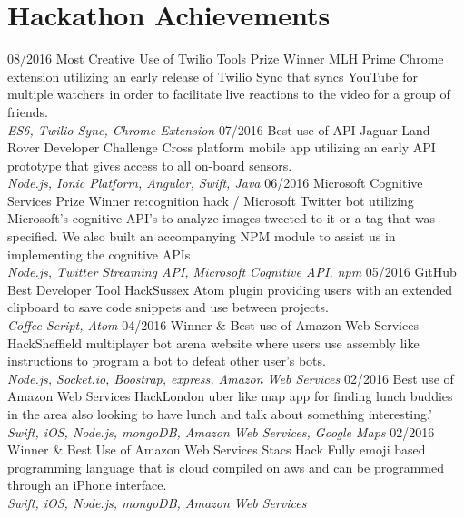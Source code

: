 \documentclass[]{friggeri-cv}
\begin{document}
\section{Hackathon Achievements}
\begin{entrylist}
  \entry
    {08/2016}
    {Most Creative Use of Twilio Tools Prize Winner}
    {MLH Prime}
    {Chrome extension utilizing an early release of Twilio Sync that syncs YouTube for multiple watchers in order to facilitate live reactions to the video for a group of friends.\\
   	\emph{ES6, Twilio Sync, Chrome Extension}}
    \entry
    {07/2016}
    {Best use of API}
    {Jaguar Land Rover Developer Challenge}
    {Cross platform mobile app utilizing an early API prototype that gives access to all on-board sensors.\\
    \emph{Node.js, Ionic Platform, Angular, Swift, Java}}
        \entry
    {06/2016}
    {Microsoft Cognitive Services Prize Winner}
    {re:cognition hack / Microsoft}
    {Twitter bot utilizing Microsoft's cognitive API's to analyze images tweeted to it or a tag that was specified. We also built an accompanying NPM module to assist us in implementing the cognitive APIs\\
    \emph{Node.js, Twitter Streaming API, Microsoft Cognitive API, npm}}
        \entry
    {05/2016}
    {GitHub Best Developer Tool}
    {HackSussex}
    {Atom plugin providing users with an extended clipboard to save code snippets and use between projects. \\
    \emph{Coffee Script, Atom}}
        \entry
    {04/2016}
    {Winner \& Best use of Amazon Web Services}
    {HackSheffield}
    {multiplayer bot arena website where users use assembly like instructions to program a bot to defeat other user's bots.\\
\emph{Node.js, Socket.io, Boostrap, express, Amazon Web Services}}
        \entry
    {02/2016}
    {Best use of Amazon Web Services}
    {HackLondon}
    {uber like map app for finding lunch buddies in the area also looking to have lunch and talk about something interesting.'\\
    \emph{Swift, iOS, Node.js, mongoDB, Amazon Web Services, Google Maps}}
        \entry
    {02/2016}
    {Winner \& Best Use of Amazon Web Services}
    {Stacs Hack}
    {Fully emoji based programming language that is cloud compiled on aws and can be programmed through an iPhone interface.\\
    \emph{Swift, iOS, Node.js, mongoDB, Amazon Web Services}}
        \entry

\end{entrylist}
\end{document}
